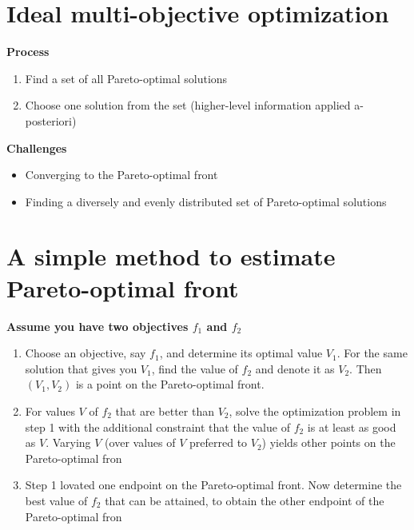 \documentclass[10pt]{article}
\begin{document}
\section{Ideal multi-objective optimization}
\textbf{Process}
\begin{enumerate}
    \item Find a set of all Pareto-optimal solutions 
    \item Choose one solution from the set (higher-level information applied a-posteriori)
\end{enumerate}
\textbf{Challenges}
\begin{itemize}
    \item Converging to the Pareto-optimal front 
    \item Finding a diversely and evenly distributed set of Pareto-optimal solutions 
\end{itemize}
\section{A simple method to estimate Pareto-optimal front}
\textbf{Assume you have two objectives $f_1 $ and $f_2 $}
\begin{enumerate}
    \item Choose an objective, say $f_1 $, and determine its optimal value $V_1 $. For the same solution that gives you $V_1 $, find the value of $f_2 $ and denote it as $V_2 $. Then $(V_1, V_2) $ is a point on the Pareto-optimal front. 
    \item For values $V $ of $f_2 $ that are better than $V_2 $, solve the optimization problem in step 1 with the additional constraint that the value of $f_2 $ is at least as good as $V $. Varying $V $ (over values of $V $ preferred to $V_2 $) yields other points on the Pareto-optimal fron 
    \item Step 1 lovated one endpoint on the Pareto-optimal front. Now determine the best value of $f_2 $ that can be attained, to obtain the other endpoint of the Pareto-optimal fron 
\end{enumerate}
\end{document}
